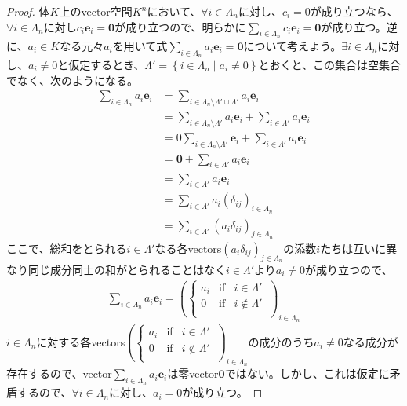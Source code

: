 \documentclass[dvipdfmx]{jsarticle}
\begin{document}
\begin{proof}
体$K$上のvector空間$K^{n}$において、$\forall i \in \varLambda_{n}$に対し、$c_{i} = 0$が成り立つなら、$\forall i \in \varLambda_{n}$に対し$c_{i}\mathbf{e}_{i} = \mathbf{0}$が成り立つので、明らかに$\sum_{i \in \varLambda_{n}} {c_{i}\mathbf{e}_{i}} = \mathbf{0}$が成り立つ。逆に、$a_{i} \in K$なる元々$a_{i}$を用いて式$\sum_{i \in \varLambda_{n}} {a_{i}\mathbf{e}_{i}} = \mathbf{0}$について考えよう。$\exists i \in \varLambda_{n}$に対し、$a_{i} \neq 0$と仮定するとき、$\varLambda' = \left\{ i \in \varLambda_{n} \middle| a_{i} \neq 0 \right\}$とおくと、この集合は空集合でなく、次のようになる。
\begin{align*}
\sum_{i \in \varLambda_{n}} {a_{i}\mathbf{e}_{i}} &= \sum_{i \in \varLambda_{n} \setminus \varLambda' \cup \varLambda'} {a_{i}\mathbf{e}_{i}}\\
&= \sum_{i \in \varLambda_{n} \setminus \varLambda'} {a_{i}\mathbf{e}_{i}} + \sum_{i \in \varLambda'} {a_{i}\mathbf{e}_{i}}\\
&= 0\sum_{i \in \varLambda_{n} \setminus \varLambda'} \mathbf{e}_{i} + \sum_{i \in \varLambda'} {a_{i}\mathbf{e}_{i}}\\
&= \mathbf{0} + \sum_{i \in \varLambda'} {a_{i}\mathbf{e}_{i}}\\
&= \sum_{i \in \varLambda'} {a_{i}\mathbf{e}_{i}}\\
&= \sum_{i \in \varLambda'} {a_{i}\left( \delta_{ij} \right)_{i \in \varLambda_{n}}}\\
&= \sum_{i \in \varLambda'} \left( a_{i}\delta_{ij} \right)_{j \in \varLambda_{n}}
\end{align*}
ここで、総和をとられる$i \in \varLambda'$なる各vectors$\left( a_{i}\delta_{ij} \right)_{j \in \varLambda_{n}}$の添数$i$たちは互いに異なり同じ成分同士の和がとられることはなく$i \in \varLambda'$より$a_{i} \neq 0$が成り立つので、
\begin{align*}
\sum_{i \in \varLambda_{n}} {a_{i}\mathbf{e}_{i}} = \left( \left\{ \begin{matrix}
a_{i} & \mathrm{if} & i \in \varLambda' \\
0 & \mathrm{if} & i \notin \varLambda' \\
\end{matrix} \right.\  \right)_{i \in \varLambda_{n}}
\end{align*}
$i \in \varLambda_{n}$に対する各vectors$\left( \left\{ \begin{matrix}
a_{i} & \mathrm{if} & i \in \varLambda' \\
0 & \mathrm{if} & i \notin \varLambda' \\
\end{matrix} \right.\  \right)_{i \in \varLambda_{n}}$の成分のうち$a_{i} \neq 0$なる成分が存在するので、vector$\sum_{i \in \varLambda_{n}} {a_{i}\mathbf{e}_{i}}$は零vector$\mathbf{0} $ではない。しかし、これは仮定に矛盾するので、$\forall i \in \varLambda_{n}$に対し、$a_{i} = 0$が成り立つ。
\end{proof}
\end{document}
